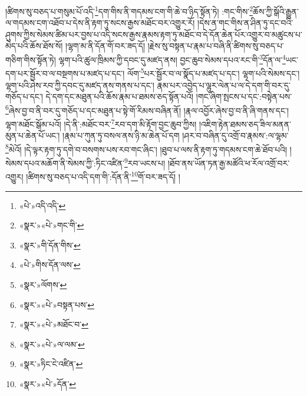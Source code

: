 །ཚིགས་སུ་བཅད་པ་གསུམ་པོ་འདི་\footnote{«པེ་»འདི་འདི་}དག་གིས་ནི་གདམས་ངག་གི་ཆེ་བ་ཉིད་སྟོན་ཏེ། :གང་གིས་\footnote{«སྣར་»«པེ་»གང་གི་}ཆོས་ཀྱི་སྒོའི་རྒྱུན་ལ་གདམས་ངག་འཐོབ་པ་དེས་ནི་རྟག་ཏུ་སངས་རྒྱས་མཐོང་བར་འགྱུར་རོ། །དེས་ན་གང་གིས་ན་ཤིན་ཏུ་དང་བའི་ཤུགས་ཀྱིས་སེམས་ཚིམ་པར་བྱས་པ་འདི་སངས་རྒྱས་རྣམས་རྟག་ཏུ་མཐོང་བ་དེ་དོན་ཆེན་པོར་འགྱུར་བ་མཚུངས་པ་མེད་པའི་ཆོས་ཐོས་སོ། །ལྷག་མ་ནི་དོན་གོ་བར་ཟད་དོ། །རྗེས་སུ་བསྟན་པ་རྣམ་པ་བཞི་ནི་ཚིགས་སུ་བཅད་པ་གཅིག་གིས་སྟོན་ཏེ། ལྷག་པའི་ཚུལ་ཁྲིམས་ཀྱི་དབང་དུ་མཛད་ནས། བྱང་ཆུབ་སེམས་དཔའ་རང་གི་\footnote{«སྣར་»གི་དོན་གིས་}དོན་ལ་\footnote{«པེ་»གིས་དོན་ལས་}ཡང་དག་པར་སྦྱོར་བ་ལ་བསྔགས་པ་མཛད་པ་དང་། ལོག་\footnote{«སྣར་»ལོགས་}པར་སྦྱོར་བ་ལ་སྣོད་པ་མཛད་པ་དང་། ལྷག་པའི་སེམས་དང་། ལྷག་པའི་ཤེས་རབ་ཀྱི་དབང་དུ་མཛད་ནས་གནས་པ་དང་། རྣམ་པར་འབྱེད་པ་ལྷུར་ལེན་པ་ལ་དེ་དག་གི་བར་དུ་གཅོད་པ་དང་། དེ་དག་དང་མཐུན་པའི་ཆོས་རྣམ་པ་ཐམས་ཅད་སྟོན་པའོ། །གང་ཞིག་སྤངས་པ་དང་:བསྟེན་པས་\footnote{«སྣར་»«པེ་»བསྟན་པས་}ཞེས་བྱ་བ་ནི་བར་དུ་གཅོད་པ་དང་མཐུན་པ་སྟེ་གོ་རིམས་བཞིན་ནོ། །རྣལ་འབྱོར་ཞེས་བྱ་བ་ནི་ཞི་གནས་དང་། ལྷག་མཐོང་སྒོམ་པའོ། །དེ་ནི་:མཐོང་བར་\footnote{«སྣར་»«པེ་»མཐོང་བ་}རབ་དག་མི་རྟོག་བྱང་ཆུབ་ཀྱིས། །འཇིག་རྟེན་ཐམས་ཅད་ཟིལ་མནན་མུན་པ་ཆེན་པོ་ཡང་། །རྣམ་པ་ཀུན་ཏུ་བསལ་ནས་ཉི་མ་ཆེན་པོ་དག །ཤར་བ་བཞིན་དུ་འགྲོ་བ་རྣམས་:ལ་ལྷམ་\footnote{«སྣར་»«པེ་»ལ་ལམ་}མེའོ། །དེ་ལྟར་རྟག་ཏུ་དགེ་བ་བསགས་པས་རབ་གང་ཞིང་། །ཐུབ་པ་ལས་ནི་རྟག་ཏུ་གདམས་ངག་ཆེ་ཐོབ་པའི། །སེམས་དཔའ་མཆོག་ནི་སེམས་ཀྱི་:ཏིང་འཛིན་\footnote{«སྣར་»ཏིང་ངེ་འཛིན་}རབ་ཡངས་པ། །ཐོབ་ནས་ཡོན་ཏན་རྒྱ་མཚོའི་ཕ་རོལ་འགྲོ་བར་འགྱུར། །ཚིགས་སུ་བཅད་པ་འདི་དག་གི་:དོན་ནི་\footnote{«སྣར་»«པེ་»དོན་}གོ་བར་ཟད་དོ། །
